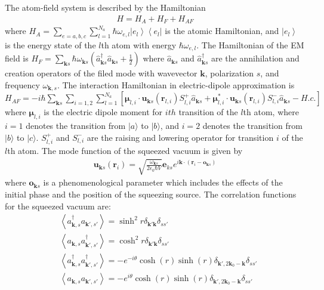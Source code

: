\documentclass[aps,showpacs,twocolumn,twoside,groupedaddress]{revtex4}
\let\vec\bm
\begin{document}

The atom-field system is described by the Hamiltonian \begin{equation}
  \label{eq1}
  \begin{gathered}
H=H_{A}+H_{F}+H_{AF}
 \end{gathered}
\end{equation}
where
$H_{A}=\sum_{e=a,b,c}\sum_{l=1}^{N_a}\hbar\omega_{e,l}\left|e_{l}\right\rangle \left\langle e_{l}\right|$  
is the atomic Hamiltonian, and $ \left|e_{l}\right\rangle $ is the energy state of the $l$th atom with energy $\hbar\omega_{e,l}$. The Hamiltonian of the EM field is
$H_{F}=\sum_{\vec{k}s}\hbar\omega_{\vec{k}s}(\hat{a}_{\vec{k}s}^{\dagger}\hat{a}_{\vec{k}s}+\frac{1}{2})$
where $\hat{a}_{\vec{k}s}$ and $\hat{a}_{\vec{k}s}^{\dagger}$ are the annihilation and creation operators of the filed mode with wavevector $ \vec{k}$, polarization $s$, and frequency $\omega_{\vec{k},s}$. The interaction Hamiltonian in electric-dipole approximation is
$H_{AF}=-i\hbar\sum_{\vec{k}s}\sum_{i=1,2}\sum_{l=1}^{N_{a}}[\vec{\mu}_{l,i}\cdot\vec{u}_{\vec{k}s}(\vec{r}_{l,i})S_{l,i}^{+}\hat{a}_{\vec{k}s}+\vec{\mu}_{l,i}^{*}\cdot\vec{u}_{\vec{k}s}(\vec{r}_{l,i})S_{l,i}^{-}\hat{a}_{\vec{k}s}-H.c.]$
where $ \vec{\mu}_{l,i} $ is the electric dipole moment for $ith$ transition of the $l$th atom, where $i=1$ denotes the transition from $|a\rangle$ to $|b\rangle$, and $i=2$ denotes the transition from $|b\rangle$ to $|c\rangle$. $ S_{l,i}^{+} $ and $S_{l,i}^{-} $ are the raising and lowering operator for transition $i$ of the $l$th atom. The mode function of the squeezed vacuum is given by
\begin{equation}
  \label{eq2b}
  \begin{gathered}
\vec{u}_{\vec{k}s}(\vec{r}_{i})=\sqrt{\frac{\omega_{\vec{k}s}}{2\epsilon_{0}\hbar V}}\vec{e}_{ks}e^{i\vec{k}\cdot(\vec{r}_{i}-\vec{o}_{\vec{k}s})}
 \end{gathered}
\end{equation}
where $\vec{o}_{\vec{k}s} $ is a phenomenological parameter which includes the effects of the initial phase and the position of the squeezing source\cite{You2018}. The correlation functions for the squeezed vacuum are\cite{scully1999quantum}:
\begin{equation}
\label{eq0a}
\begin{split}
& \left\langle a_{\vec{k},s}^{\dagger}a_{\vec{k}',s'}\right\rangle =\sinh^{2}r\delta_{\vec{k}'\vec{k}}\delta_{ss'} \\
& \left\langle a_{\vec{k},s}a_{\vec{k}',s'}^{\dagger}\right\rangle =\cosh^{2}r\delta_{\vec{k}'\vec{k}}\delta_{ss'}\\
& \left\langle a_{\vec{k},s}^{\dagger}a_{\vec{k}',s'}^{\dagger}\right\rangle =-e^{-i\theta}\cosh(r)\sinh(r)\delta_{\vec{k}',2\vec{k}_{0}-\vec{k}}\delta_{ss'}\\
&\left\langle a_{\vec{k},s}a_{\vec{k}',s'}\right\rangle =-e^{i\theta}\cosh(r)\sinh(r)\delta_{\vec{k}',2\vec{k}_{0}-\vec{k}}\delta_{ss'}
\end{split}
\end{equation}
\end{document}
